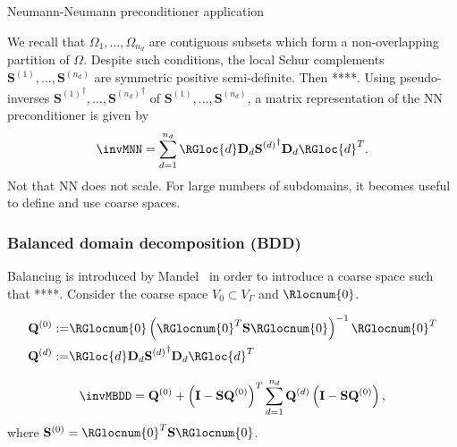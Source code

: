 \documentclass{article}
\begin{document}
\begin{algorithm}[ht]
	\caption{Neumann-Neumann preconditioner application~\cite{Mandel1993}}
	\label{alg:NN}
	\begin{algorithmic}[1]
		\ENDFOR
	\end{algorithmic}
\end{algorithm}






We recall that $\Omega_1,\dots,\Omega_{n_d}$ are contiguous subsets which form a non-overlapping partition of $\Omega$.
Despite such conditions, the local Schur complements $\mathbf{S}^{(1)},\dots,\mathbf{S}^{(n_d)}$ are symmetric positive semi-definite.
Then ****.
Using pseudo-inverses ${\mathbf{S}^{(1)}}^\dagger,\dots,{\mathbf{S}^{(n_d)}}^\dagger$ of $\mathbf{S}^{(1)},\dots,\mathbf{S}^{(n_d)}$, a matrix representation of the NN preconditioner is given by
\begin{align}
\invMNN=\sum_{d=1}^{n_d}
\RGloc{d}
\mathbf{D}_d
{\mathbf{S}^{(d)}}^\dagger
\mathbf{D}_d
\RGloc{d}^T.
\end{align}
Not that NN does not scale.
For large numbers of subdomains, it becomes useful to define and use coarse spaces.

\subsubsection{Balanced domain decomposition (BDD)}
Balancing is introduced by Mandel~\cite{Mandel1993} in order to introduce a coarse space such that ****.
Consider the coarse space $V_0\subset V_\Gamma$ and $\Rlocnum{0}$.

\begin{align}
\mathbf{Q}^{(0)}:=&\RGlocnum{0}\left(\RGlocnum{0}^T\mathbf{S}\RGlocnum{0}\right)^{-1}\RGlocnum{0}^T\\
\mathbf{Q}^{(d)}:=&\RGloc{d}\mathbf{D}_d{\mathbf{S}^{(d)}}^\dagger\mathbf{D}_d\RGloc{d}^T
\end{align}


\begin{align}
\invMBDD=
{\mathbf{Q}^{(0)}}
+
\left(\mathbf{I}-\mathbf{S}\mathbf{Q}^{(0)}\right)^T
\sum_{d=1}^{n_d}
\mathbf{Q}^{(d)}
\left(\mathbf{I}-\mathbf{S}\mathbf{Q}^{(0)}\right),
\end{align}
where $\mathbf{S}^{(0)}=\RGlocnum{0}^T\mathbf{S}\RGlocnum{0}$.
\end{document}
